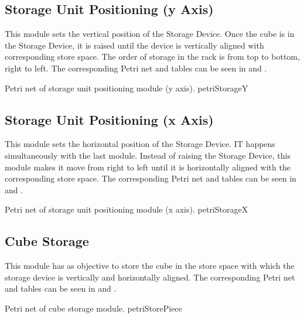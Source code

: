\subsection{Storage Unit Positioning (y Axis)}
This module sets the vertical position of the Storage Device. Once the cube is
in the Storage Device, it is raised until the device is vertically aligned with
corresponding store space. The order of storage in the rack is from top to
bottom, right to left.   
The corresponding Petri net and tables can be seen in
 and .

\pagebreak

{Petri net of storage unit positioning module (y axis).}
{petriStorageY}
\subsection{Storage Unit Positioning (x Axis)}
This module sets the horizontal position of the Storage Device. IT happens
simultaneously with the last module. Instead of raising the Storage Device, this
module makes it move from right to left until it is horizontally aligned with the
corresponding store space.  
The corresponding Petri net and tables can be seen in
 and .


{Petri net of storage unit positioning module (x axis).}
{petriStorageX}
\subsection{Cube Storage}
This module has as objective to store the cube in the store space with which the
storage device is vertically and horizontally aligned. 
The corresponding Petri net and tables can be seen in
 and .

\pagebreak

{Petri net of cube storage module.}
{petriStorePiece}

